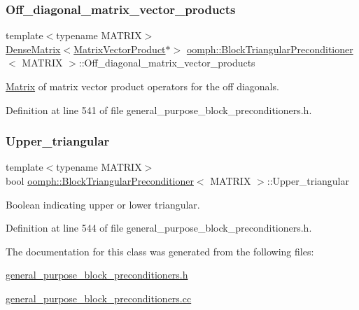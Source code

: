 \subsubsection{\texorpdfstring{Off\+\_\+diagonal\+\_\+matrix\+\_\+vector\+\_\+products}{Off\_diagonal\_matrix\_vector\_products}}
{\footnotesize\ttfamily template$<$typename M\+A\+T\+R\+IX$>$ \\
\hyperlink{classoomph_1_1DenseMatrix}{Dense\+Matrix}$<$\hyperlink{classoomph_1_1MatrixVectorProduct}{Matrix\+Vector\+Product}$\ast$$>$ \hyperlink{classoomph_1_1BlockTriangularPreconditioner}{oomph\+::\+Block\+Triangular\+Preconditioner}$<$ M\+A\+T\+R\+IX $>$\+::Off\+\_\+diagonal\+\_\+matrix\+\_\+vector\+\_\+products\hspace{0.3cm}{\ttfamily [private]}}



\hyperlink{classoomph_1_1Matrix}{Matrix} of matrix vector product operators for the off diagonals. 



Definition at line 541 of file general\+\_\+purpose\+\_\+block\+\_\+preconditioners.\+h.

\mbox{\label{classoomph_1_1BlockTriangularPreconditioner_afdab4f2510ef81938b177c65609f6d39}} 
\subsubsection{\texorpdfstring{Upper\+\_\+triangular}{Upper\_triangular}}
{\footnotesize\ttfamily template$<$typename M\+A\+T\+R\+IX$>$ \\
bool \hyperlink{classoomph_1_1BlockTriangularPreconditioner}{oomph\+::\+Block\+Triangular\+Preconditioner}$<$ M\+A\+T\+R\+IX $>$\+::Upper\+\_\+triangular\hspace{0.3cm}{\ttfamily [private]}}



Boolean indicating upper or lower triangular. 



Definition at line 544 of file general\+\_\+purpose\+\_\+block\+\_\+preconditioners.\+h.



The documentation for this class was generated from the following files\+:\begin{DoxyCompactItemize}
\item 
\hyperlink{general__purpose__block__preconditioners_8h}{general\+\_\+purpose\+\_\+block\+\_\+preconditioners.\+h}\item 
\hyperlink{general__purpose__block__preconditioners_8cc}{general\+\_\+purpose\+\_\+block\+\_\+preconditioners.\+cc}\end{DoxyCompactItemize}
